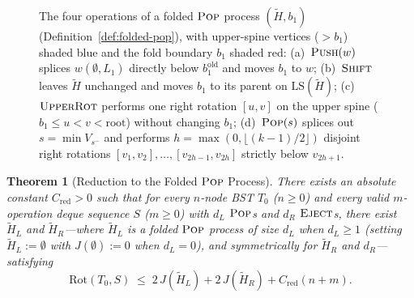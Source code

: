 \documentclass[11pt]{article}
\newtheorem{theorem}{Theorem}[section]
\theoremstyle{definition}
\theoremstyle{remark}
\newcommand{\LS}{\mathrm{LS}}
\newcommand{\Rot}{\mathrm{Rot}}
\newcommand{\PUSH}{\textnormal{\scshape Push}}
\newcommand{\POP}{\textnormal{\scshape Pop}}
\newcommand{\EJECT}{\textnormal{\scshape Eject}}
\newcommand{\SHIFT}{\textnormal{\scshape Shift}}
\newcommand{\UPROT}{\textnormal{\scshape UpperRot}}
\begin{document}
\begin{figure}[ht]
\caption{The four operations of a folded $\POP$ process $(\widetilde{H}, b_1)$ (Definition~\ref{def:folded-pop}), with upper-spine vertices ($> b_1$) shaded blue and the fold boundary $b_1$ shaded red: (a)~$\PUSH(w)$ splices $w(\emptyset, L_1)$ directly below $b_1^{\mathrm{old}}$ and moves $b_1$ to $w$; (b)~$\SHIFT$ leaves $\widetilde{H}$ unchanged and moves $b_1$ to its parent on $\LS(\widetilde{H})$; (c)~$\UPROT$ performs one right rotation $[u, v]$ on the upper spine ($b_1 \le u < v < \mathrm{root}$) without changing $b_1$; (d)~$\POP(s)$ splices out $s = \min V_{s^-}$ and performs $h = \max(0, \lfloor(k-1)/2\rfloor)$ disjoint right rotations $[v_1, v_2], \dots, [v_{2h-1}, v_{2h}]$ strictly below $v_{2h+1}$.}
\label{fig:folded-ops}
\end{figure}

\begin{theorem}[Reduction to the Folded $\POP$ Process]
\label{thm:mod1-reduction}
There exists an absolute constant $C_{\mathrm{red}} > 0$ such that for every $n$-node BST $T_0$ ($n \ge 0$) and every valid $m$-operation deque sequence $S$ ($m \ge 0$) with $d_L$ $\POP$s and $d_R$ $\EJECT$s, there exist $\widetilde{H}_L$ and $\widetilde{H}_R$---where $\widetilde{H}_L$ is a folded $\POP$ process of size $d_L$ when $d_L \ge 1$ (setting $\widetilde{H}_L := \emptyset$ with $J(\emptyset) := 0$ when $d_L = 0$), and symmetrically for $\widetilde{H}_R$ and $d_R$---satisfying
\[
\Rot(T_0, S) \;\le\; 2\,J(\widetilde{H}_L) + 2\,J(\widetilde{H}_R) + C_{\mathrm{red}}(n + m).
\]
\end{theorem}
\end{document}
